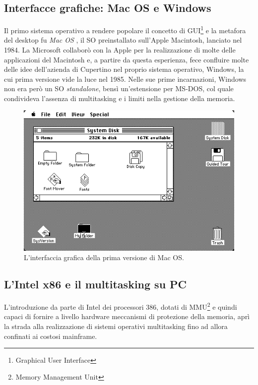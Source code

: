 \documentclass[12pt,a4paper]{report}
\begin{document}
		\subsection{Interfacce grafiche: Mac OS e Windows}
			Il primo sistema operativo a rendere popolare il concetto di GUI\footnote{Graphical User Interface} e la metafora del desktop
			fu \emph{Mac OS} \cite{WIKI_MacHistory}, il SO preinstallato sull'Apple Macintosh, lanciato nel 1984.
			La Microsoft collaborò con la Apple per la realizzazione di molte delle applicazioni del Macintosh e, a partire da questa
			esperienza, fece confluire molte delle idee dell'azienda di Cupertino nel proprio sistema operativo, Windows, la cui
			prima versione vide la luce nel 1985.
			Nelle sue prime incarnazioni, Windows non era però un SO \emph{standalone}, bensì un'estensione per MS-DOS,
			col quale condivideva l'assenza di multitasking e i limiti nella gestione della memoria.
	
			\begin{figure}[htbp]
			\centering
			\includegraphics[scale=0.6]{img/macos.png}
			\caption{L'interfaccia grafica della prima versione di Mac OS.\label{fig:macos}}
			\end{figure}
			
		\subsection{L'Intel x86 e il multitasking su PC}
			L'introduzione da parte di Intel dei processori 386, dotati di MMU\footnote{Memory Management Unit} e quindi capaci di fornire a
			livello hardware meccanismi di protezione della memoria, aprì la strada alla realizzazione di sistemi operativi multitasking
			fino ad allora confinati ai costosi mainframe.
			
\end{document}
